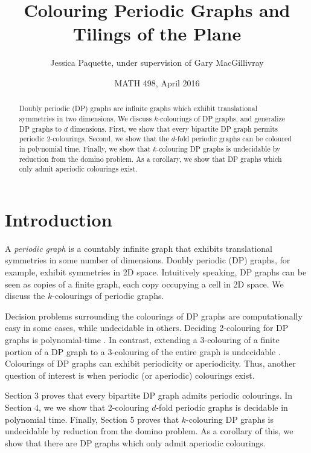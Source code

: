 \documentclass[letterpaper]{article}
\title{Colouring Periodic Graphs and Tilings of the Plane}
\author{Jessica Paquette, under supervision of Gary MacGillivray}
\date{MATH 498, April 2016}
\begin{document}
\maketitle

\begin{abstract}
Doubly periodic (DP) graphs are infinite graphs which exhibit translational symmetries in two dimensions.
We discuss $k$-colourings of DP graphs, and generalize DP graphs to $d$ dimensions.
First, we show that every bipartite DP graph permits periodic 2-colourings.
Second, we show that the $d$-fold periodic graphs can be coloured in polynomial time.
Finally, we show that $k$-colouring DP graphs is undecidable by reduction from the domino problem.
As a corollary, we show that DP graphs which only admit aperiodic colourings exist.
\end{abstract}

\section{Introduction}

A \emph{periodic graph} is a countably infinite graph that exhibits translational symmetries in some number of dimensions.
Doubly periodic (DP) graphs, for example, exhibit symmetries in 2D space.
Intuitively speaking, DP graphs can be seen as copies of a finite graph, each copy occupying a cell in 2D space.
We discuss the $k$-colourings of periodic graphs.

Decision problems surrounding the colourings of DP graphs are computationally easy in some cases, while undecidable in others.
Deciding 2-colouring for DP graphs is polynomial-time \cite{bauslaugh05}. 
In contrast, extending a 3-colouring of a finite portion of a DP graph to a 3-colouring of the entire graph is undecidable \cite{burr84}.
Colourings of DP graphs can exhibit periodicity or aperiodicity.
Thus, another question of interest is when periodic (or aperiodic) colourings exist.

Section 3 proves that every bipartite DP graph admits periodic colourings.
In Section 4, we we show that 2-colouring $d$-fold periodic graphs is decidable in polynomial time.
Finally, Section 5 proves that $k$-colouring DP graphs is undecidable by reduction from the domino problem.
As a corollary of this, we show that there are DP graphs which only admit aperiodic colourings.

\end{document}
